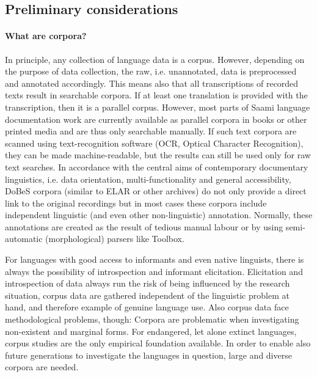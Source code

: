 \documentclass[a4paper,12pt]{article}
\begin{document}
\subsection{Preliminary considerations}%
\paragraph{What are corpora?} In principle, any collection of language data is a corpus. However, depending on the purpose of data collection, the raw, i.e. unannotated,  data is preprocessed and annotated accordingly. This means also that all transcriptions of recorded texts result in searchable corpora. If at least one translation is provided with the transcription, then it is a parallel corpus. However, most parts of Saami language documentation work are currently available as parallel corpora in books or other printed media and are thus only searchable manually. If such text corpora are scanned using text-recognition software (OCR, Optical Character Recognition), they can be made machine-readable, but the results can still be used only for raw text searches. In accordance with the central aims of contemporary documentary linguistics, i.e. data orientation, multi-functionality and general accessibility, DoBeS corpora (similar to ELAR or other archives) do not only provide a direct link to the original recordings but in most cases these corpora include independent linguistic (and even other non-linguistic) annotation. Normally, these annotations are created as the result of tedious manual labour or by using semi-automatic (morphological) parsers like Toolbox.

For languages with good access to informants and even native linguists, there is always the possibility of introspection and informant elicitation. Elicitation and introspection of data always run the risk of being influenced by the research situation, corpus data are gathered independent of the linguistic problem at hand, and therefore example of genuine language use. Also corpus data face methodological problems, though: Corpora are problematic when investigating non-existent and marginal forms.  For endangered, let alone extinct languages, corpus studies are the only empirical foundation available. In order to enable also future generations to investigate the languages in question, large and diverse corpora are needed.
\end{document}
